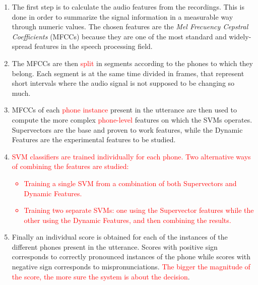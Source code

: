 \begin{enumerate}

 \item The first step is to calculate the audio features from the recordings.
 This is done in order to summarize the signal information
 in a measurable way through numeric values. The chosen features
 are the \textit{Mel Frecuency Cepstral Coefficients} (MFCCs) because they are one of the
 most standard and widely-spread features in the speech processing field.

 \item The MFCCs are then \textcolor{red}{split} in segments according to the phones to which they
 belong. Each segment is at the same time divided in frames, that represent short
 intervals where the audio signal is not supposed to be changing so much.

 \item MFCCs of each \textcolor{red}{phone instance} present in the utterance
 are then used to compute the more complex \textcolor{red}{phone-level} features
 on which the SVMs operates. Supervectors are the base and proven to work features,
 while the Dynamic Features are the experimental features to be studied.

 \item \textcolor{red}{
  SVM classifiers are trained individually for each phone. Two alternative ways of combining the
  features are studied:
    \begin{itemize}
      \item Training a single SVM from a combination of both Supervectors and Dynamic Features.
      \item Training two separate SVMs: one using the Supervector features while the other using the
      Dynamic Features, and then combining the results.
    \end{itemize}
 }

 \item Finally an individual score is obtained for each of the instances
 of the different phones present in the
 utterance. Scores with positive sign corresponds to correctly pronounced instances of the phone
 while scores with negative sign corresponds to mispronunciations.
 \textcolor{red}{The bigger the magnitude of the score, the more sure the system is about the
 decision}.

\end{enumerate}

